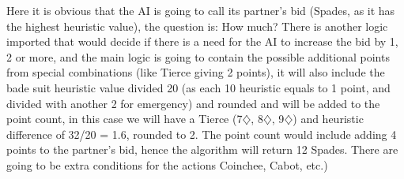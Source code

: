 Here it is obvious that the AI
is going to call its partner’s bid (Spades, as it has the highest heuristic value), the question is: How much? There is another logic
imported that would decide if there is a need for the AI to increase the bid by 1, 2 or
more, and the main logic is going to contain the possible additional points from special
combinations (like Tierce giving 2 points), it will also include the bade suit heuristic
value divided 20 (as each 10 heuristic equals to 1 point, and divided with another 2 for emergency)
and rounded and will be added to the point
count, in this case we will have a Tierce (7$\diamondsuit$, 8$\diamondsuit$, 9$\diamondsuit$) and heuristic difference of 32/20
= 1.6, rounded to 2. The point count would include adding 4 points to the partner’s bid,
hence the algorithm will return 12 Spades. There are going to be extra conditions for
the actions Coinchee, Cabot, etc.)


